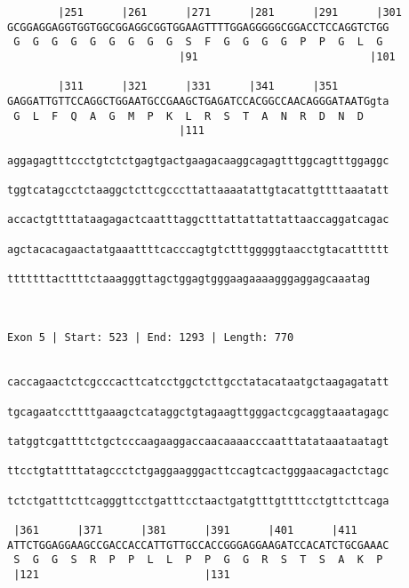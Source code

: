 \documentclass{article}
\begin{document}
\begin{Verbatim}
        |251      |261      |271      |281      |291      |301
GCGGAGGAGGTGGTGGCGGAGGCGGTGGAAGTTTTGGAGGGGGCGGACCTCCAGGTCTGG
 G  G  G  G  G  G  G  G  G  S  F  G  G  G  G  P  P  G  L  G 
                           |91                           |101
  
        |311      |321      |331      |341      |351        
GAGGATTGTTCCAGGCTGGAATGCCGAAGCTGAGATCCACGGCCAACAGGGATAATGgta
 G  L  F  Q  A  G  M  P  K  L  R  S  T  A  N  R  D  N  D    
                           |111                            
  
aggagagtttccctgtctctgagtgactgaagacaaggcagagtttggcagtttggaggc
                                                            
tggtcatagcctctaaggctcttcgcccttattaaaatattgtacattgttttaaatatt
                                                            
accactgttttataagagactcaatttaggctttattattattattaaccaggatcagac
                                                            
agctacacagaactatgaaattttcacccagtgtctttgggggtaacctgtacatttttt
                                                            
tttttttacttttctaaagggttagctggagtgggaagaaaagggaggagcaaatag
                                                         
                                                         
 
Exon 5 | Start: 523 | End: 1293 | Length: 770


caccagaactctcgcccacttcatcctggctcttgcctatacataatgctaagagatatt
                                                            
tgcagaatccttttgaaagctcataggctgtagaagttgggactcgcaggtaaatagagc
                                                            
tatggtcgattttctgctcccaagaaggaccaacaaaacccaatttatataaataatagt
                                                            
ttcctgtattttatagccctctgaggaagggacttccagtcactgggaacagactctagc
                                                            
tctctgatttcttcagggttcctgatttcctaactgatgtttgttttcctgttcttcaga
                                                            
 |361      |371      |381      |391      |401      |411     
ATTCTGGAGGAAGCCGACCACCATTGTTGCCACCGGGAGGAAGATCCACATCTGCGAAAC
 S  G  G  S  R  P  P  L  L  P  P  G  G  R  S  T  S  A  K  P 
 |121                          |131                         
  

\end{Verbatim}
\end{document}
